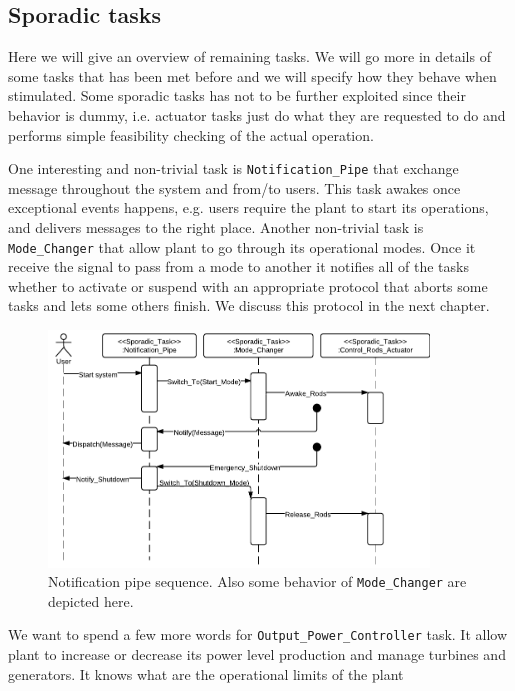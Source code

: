 \documentclass[10pt,a4paper]{report}
\begin{document}
\subsection{Sporadic tasks}
Here we will give an overview of remaining tasks. We will go more in details of
some tasks that has been met before and we will specify how they behave when 
stimulated. Some sporadic tasks has not to be further exploited since their 
behavior is dummy, i.e. actuator tasks just do what they are requested to do 
and performs simple feasibility checking of the actual operation.

One interesting and non-trivial task is \texttt{Notification\_Pipe} that exchange
message throughout the system and from/to users. This task awakes once exceptional
events happens, e.g. users require the plant to start its operations, and 
delivers messages to the right place. Another non-trivial task is 
\texttt{Mode\_Changer} that allow plant to go through its operational modes. 
Once it receive the signal to pass from a mode to another it notifies all of 
the tasks whether to activate or suspend with an appropriate 
protocol that aborts some tasks and lets some others finish. We discuss this
protocol in the next chapter.
\begin{figure}[htb]
\centering
\includegraphics[width=0.9\textwidth]{diagrams/Mode_Changer}
\caption{
    Notification pipe sequence. Also some behavior of 
    \texttt{Mode\_Changer} are depicted here.
}
\end{figure}
We want to spend a few more words for \texttt{Output\_Power\_Controller} 
task. It allow plant to increase or decrease its power level production and manage 
turbines and generators. It knows what are the operational limits of the plant
\end{document}
